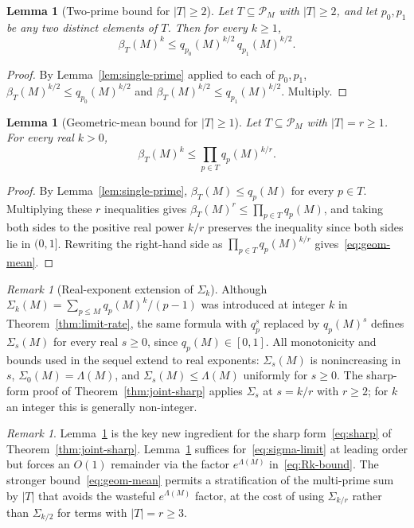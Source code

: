 \documentclass[11pt]{article}
\newtheorem{lemma}[theorem]{Lemma}
\theoremstyle{remark}
\newtheorem{remark}[theorem]{Remark}
\newcommand{\PM}{\mathcal{P}_M}
\begin{document}
\begin{lemma}[Two-prime bound for $|T| \geq 2$]\label{lem:two-prime}
Let $T \subseteq \PM$ with $|T| \geq 2$, and let $p_0, p_1$ be any two distinct elements of $T$. Then for every $k \geq 1$,
\[
\beta_T(M)^k \leq q_{p_0}(M)^{k/2}\, q_{p_1}(M)^{k/2}.
\]
\end{lemma}
\begin{proof}
By Lemma~\ref{lem:single-prime} applied to each of $p_0, p_1$, $\beta_T(M)^{k/2} \leq q_{p_0}(M)^{k/2}$ and $\beta_T(M)^{k/2} \leq q_{p_1}(M)^{k/2}$. Multiply.
\end{proof}

\begin{lemma}[Geometric-mean bound for $|T| \geq 1$]\label{lem:geom-mean}
Let $T \subseteq \PM$ with $|T| = r \geq 1$. For every real $k > 0$,
\begin{equation}\label{eq:geom-mean}
\beta_T(M)^k \leq \prod_{p \in T} q_p(M)^{k/r}.
\end{equation}
\end{lemma}
\begin{proof}
By Lemma~\ref{lem:single-prime}, $\beta_T(M) \leq q_p(M)$ for every $p \in T$. Multiplying these $r$ inequalities gives $\beta_T(M)^r \leq \prod_{p \in T} q_p(M)$, and taking both sides to the positive real power $k/r$ preserves the inequality since both sides lie in $(0, 1]$. Rewriting the right-hand side as $\prod_{p \in T} q_p(M)^{k/r}$ gives~\eqref{eq:geom-mean}.
\end{proof}

\begin{remark}[Real-exponent extension of $\Sigma_k$]\label{rem:sigma-real}
Although $\Sigma_k(M) = \sum_{p \leq M} q_p(M)^k/(p-1)$ was introduced at integer $k$ in Theorem~\ref{thm:limit-rate}, the same formula with $q_p^s$ replaced by $q_p(M)^s$ defines $\Sigma_s(M)$ for every real $s \geq 0$, since $q_p(M) \in [0, 1]$. All monotonicity and bounds used in the sequel extend to real exponents: $\Sigma_s(M)$ is nonincreasing in $s$, $\Sigma_0(M) = \Lambda(M)$, and $\Sigma_s(M) \leq \Lambda(M)$ uniformly for $s \geq 0$. The sharp-form proof of Theorem~\ref{thm:joint-sharp} applies $\Sigma_s$ at $s = k/r$ with $r \geq 2$; for $k$ an integer this is generally non-integer.
\end{remark}

\begin{remark}\label{rem:why-geom-mean}
Lemma~\ref{lem:geom-mean} is the key new ingredient for the sharp form~\eqref{eq:sharp} of Theorem~\ref{thm:joint-sharp}. Lemma~\ref{lem:two-prime} suffices for~\eqref{eq:sigma-limit} at leading order but forces an $O(1)$ remainder via the factor $e^{\Lambda(M)}$ in~\eqref{eq:Rk-bound}. The stronger bound~\eqref{eq:geom-mean} permits a stratification of the multi-prime sum by $|T|$ that avoids the wasteful $e^{\Lambda(M)}$ factor, at the cost of using $\Sigma_{k/r}$ rather than $\Sigma_{k/2}$ for terms with $|T| = r \geq 3$.
\end{remark}
\end{document}
